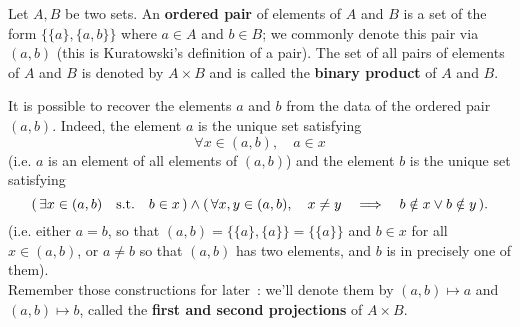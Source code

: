 \begin{definition} \label{binary-product-of-sets}
	Let $A,B$ be two sets. An \textbf{ordered pair} of elements of $A$ and $B$ is a set of the form $\{\{a\}, \{a,b\}\}$ where $a \in A$ and $b \in B$; we commonly denote this pair via $(a,b)$ (this is Kuratowski's definition of a pair). The set of all pairs of elements of $A$ and $B$ is denoted by $A \times B$ and is called the \textbf{binary product} of $A$ and $B$. 
\end{definition}

\begin{remark}
	It is possible to recover the elements $a$ and $b$ from the data of the ordered pair $(a,b)$. Indeed, the element $a$ is the unique set satisfying
	\[
		\forall x \in (a,b), \quad a \in x
	\]
	(i.e. $a$ is an element of all elements of $(a,b)$) and the element $b$ is the unique set satisfying
	\[
		( \, \exists x \in (a,b) \quad \text{s.t.} \quad b \in x \, ) \wedge 
		( \, \forall x,y \in (a,b), \quad x \neq y \quad \Longrightarrow \quad b \notin x \vee b \notin y \, ).
	\]
	(i.e. either $a=b$, so that $(a,b) = \{\{a\}, \{a\}\} = \{\{a\}\}$ and $b \in x$ for all $x \in (a,b)$, or $a \neq b$ so that $(a,b)$ has two elements, and $b$ is in precisely one of them).
	\\

	Remember those constructions for later~: we'll denote them by $(a,b) \mapsto a$ and $(a,b) \mapsto b$, called the \textbf{first and second projections} of $A \times B$.
\end{remark}

